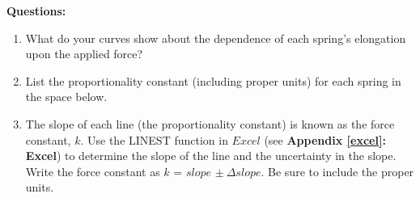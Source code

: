 \pagebreak

\textbf{Questions:}

\begin{enumerate}
\item What do your curves show about the dependence of each spring's elongation upon the applied force?\vspace{30mm}

\item List the proportionality constant (including proper units) for each spring in the space below.\vspace{30mm}

\item The slope of each line (the proportionality constant) is known as the 
force constant, $k$. Use the LINEST function in $Excel$ (see \textbf{Appendix \ref{excel}:
 Excel}) to determine the slope of the line and the uncertainty in the slope. 
Write the force constant as $k$ = $slope$ \( \pm \ \Delta  slope\).  Be sure to 
include the proper units.
\end{enumerate}
